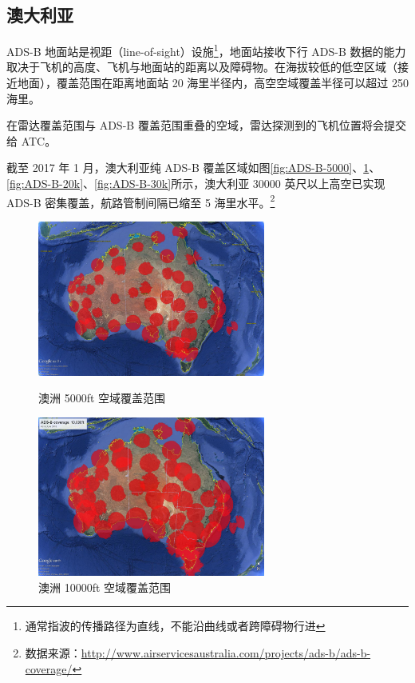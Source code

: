 \subsection{澳大利亚}

ADS-B 地面站是视距（line-of-sight）设施\footnote{通常指波的传播路径为直线，不能沿曲线或者跨障碍物行进}，地面站接收下行 ADS-B 数据的能力取决于飞机的高度、飞机与地面站的距离以及障碍物。在海拔较低的低空区域（接近地面），覆盖范围在距离地面站 20 海里半径内，高空空域覆盖半径可以超过 250 海里。

在雷达覆盖范围与 ADS-B 覆盖范围重叠的空域，雷达探测到的飞机位置将会提交给 ATC。

截至 2017 年 1 月，澳大利亚纯 ADS-B 覆盖区域如图\ref{fig:ADS-B-5000}、\ref{fig:ADS-B-10k}、\ref{fig:ADS-B-20k}、\ref{fig:ADS-B-30k}所示，澳大利亚 30000 英尺以上高空已实现 ADS-B 密集覆盖，航路管制间隔已缩至 5 海里水平。\footnote{数据来源：\url{http://www.airservicesaustralia.com/projects/ads-b/ads-b-coverage/}}

\begin{figure}[htbp]
\centering
\begin{minipage}[t]{0.48\textwidth}
\centering
\includegraphics[width=7.5cm]{pic/ADS-B-5000.jpg}
\caption{澳洲 5000ft 空域覆盖范围}
\label{fig:ADS-B-5000}
\end{minipage}
\begin{minipage}[t]{0.48\textwidth}
\centering
\includegraphics[width=7.5cm]{pic/ADS-B-10k.jpg}
\caption{澳洲 10000ft 空域覆盖范围}
\label{fig:ADS-B-10k}
\end{minipage}
\end{figure}

